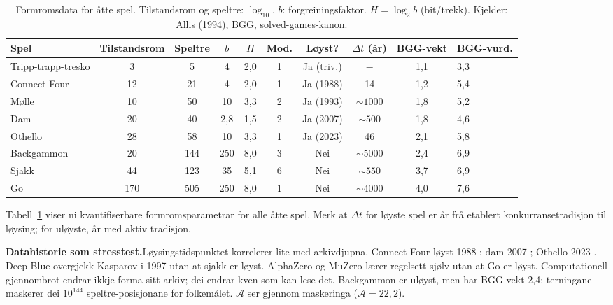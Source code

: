 \documentclass[10pt,twocolumn]{article}
\begin{document}
\begin{table}[t]
\centering\small
\caption{Formromsdata for \aa tte spel. Tilstandsrom og speltre: $\log_{10}$. $b$: forgreiningsfaktor. $H = \log_2 b$ (bit/trekk). Kjelder: Allis (1994), BGG, solved-games-kanon.}
\label{tab:formrom}
\begin{tabular}{@{}lccccccccl@{}}
\toprule
Spel & Tilstandsrom & Speltre & $b$ & $H$ & Mod. & L\o yst? & $\Delta t$ (\aa r) & BGG-vekt & BGG-vurd. \\
\midrule
Tripp-trapp-tresko & 3 & 5 & 4 & 2,0 & 1 & Ja (triv.) & $-$ & 1,1 & 3,3 \\
Connect Four & 12 & 21 & 4 & 2,0 & 1 & Ja (1988) & 14 & 1,2 & 5,4 \\
M\o lle & 10 & 50 & 10 & 3,3 & 2 & Ja (1993) & ${\sim}1000$ & 1,8 & 5,2 \\
Dam & 20 & 40 & 2,8 & 1,5 & 2 & Ja (2007) & ${\sim}500$ & 1,8 & 4,6 \\
Othello & 28 & 58 & 10 & 3,3 & 1 & Ja (2023) & 46 & 2,1 & 5,8 \\
Backgammon & 20 & 144 & 250 & 8,0 & 3 & Nei & ${\sim}5000$ & 2,4 & 6,9 \\
Sjakk & 44 & 123 & 35 & 5,1 & 6 & Nei & ${\sim}550$ & 3,7 & 6,9 \\
Go & 170 & 505 & 250 & 8,0 & 1 & Nei & ${\sim}4000$ & 4,0 & 7,6 \\
\bottomrule
\end{tabular}
\end{table}

Tabell~\ref{tab:formrom} viser ni kvantifiserbare formromsparametrar for alle \aa tte spel. Merk at $\Delta t$ for l\o yste spel er \aa r fr\aa{} etablert konkurransetradisjon til l\o ysing; for ul\o yste, \aa r med aktiv tradisjon.

\begin{mdframed}[style=sidebarbox]
\small\textbf{Datahistorie som stresstest.}\quad L\o ysingstidspunktet korrelerer lite med arkivdjupna. Connect Four l\o yst 1988 \citep{allis1994}; dam 2007 \citep{schaeffer2007}; Othello 2023 \citep{takizawa2023}. Deep Blue overgjekk Kasparov i 1997 utan at sjakk er l\o yst. AlphaZero \citep{silver2018} og MuZero l\ae rer regelsett sj\o lv utan at Go er l\o yst. Computationell gjennombrot endrar ikkje forma sitt arkiv; dei endrar kven som kan lese det. Backgammon er ul\o yst, men har BGG-vekt 2,4: terningane maskerer dei $10^{144}$ speltre-posisjonane for folkem\aa let. $\mathcal{A}$ ser gjennom maskeringa ($\mathcal{A} = 22{,}2$).
\end{mdframed}
\end{document}
